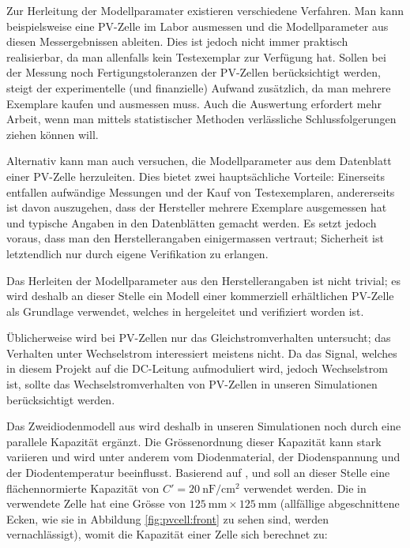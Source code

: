 Zur Herleitung der Modellparamater existieren verschiedene Verfahren. Man kann
beispielsweise eine  PV-Zelle im Labor  ausmessen und die  Modellparameter aus
diesen  Messergebnissen  ableiten.   Dies  ist jedoch  nicht  immer  praktisch
realisierbar, da man allenfalls kein Testexemplar zur Verf\"ugung hat.  Sollen
bei  der  Messung  noch Fertigungstoleranzen  der  PV-Zellen  ber\"ucksichtigt
werden,  steigt der  experimentelle  (und  finanzielle) Aufwand  zus\"atzlich,
da  man  mehrere Exemplare  kaufen  und  ausmessen muss. Auch  die  Auswertung
erfordert mehr Arbeit, wenn  man mittels statistischer Methoden verl\"assliche
Schlussfolgerungen ziehen k\"onnen will.

Alternativ   kann   man   auch   versuchen,  die   Modellparameter   aus   dem
Datenblatt  einer  PV-Zelle  herzuleiten. Dies  bietet  zwei  haupts\"achliche
Vorteile: Einerseits  entfallen  aufw\"andige  Messungen   und  der  Kauf  von
Testexemplaren, andererseits ist davon auszugehen, dass der Hersteller mehrere
Exemplare ausgemessen hat  und typische Angaben in  den Datenbl\"atten gemacht
werden.  Es setzt jedoch voraus,  dass man den Herstellerangaben einigermassen
vertraut;  Sicherheit  ist  letztendlich  nur  durch  eigene  Verifikation  zu
erlangen.

Das Herleiten der Modellparameter aus den Herstellerangaben ist nicht trivial;
es wird deshalb  an dieser Stelle ein Modell  einer kommerziell erh\"altlichen
PV-Zelle    als  Grundlage  verwendet,   welches  in
\cite{pvcell:masmoudi} hergeleitet und verifiziert worden ist.

\"Ublicherweise wird  bei PV-Zellen  nur das  Gleichstromverhalten untersucht;
das Verhalten  unter Wechselstrom interessiert meistens  nicht. Da das Signal,
welches  in  diesem  Projekt  auf die  DC-Leitung  aufmoduliert  wird,  jedoch
Wechselstrom ist,  sollte das  Wechselstromverhalten von PV-Zellen  in unseren
Simulationen ber\"ucksichtigt werden.

Das  Zweidiodenmodell  aus  \cite{pvcell:masmoudi}  wird  deshalb  in  unseren
Simulationen   noch   durch    eine   parallele   Kapazit\"at   erg\"anzt. Die
Gr\"ossenordnung   dieser   Kapazit\"at   kann  stark   variieren   und   wird
unter    anderem   vom    Diodenmaterial,   der    Diodenspannung   und    der
Diodentemperatur   beeinflusst. Basierend    auf   \cite{capacitance:hegedus},
\cite{capacitance:mandal}     und      \cite{capacitance:mauk}     soll     an
dieser    Stelle   eine    fl\"achennormierte    Kapazit\"at    von   $C'    =
\SI{20}{\nano\farad\per\centi\meter\squared}$    verwendet   werden. Die    in
\cite{pvcell:masmoudi}    verwendete    Zelle    hat   eine    Gr\"osse    von
$\SI{125}{\milli\meter}    \times     \SI{125}{\milli\meter}$    (allf\"allige
abgeschnittene  Ecken, wie  sie in  Abbildung \ref{fig:pvcell:front}  zu sehen
sind,  werden  vernachl\"assigt),  womit  die  Kapazit\"at  einer  Zelle  sich
berechnet zu:

